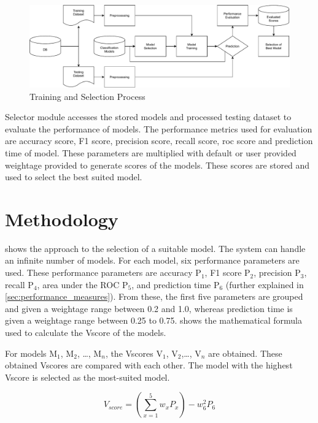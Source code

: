 \begin{figure}[H]
  \centering
  \includegraphics[width=0.9\columnwidth]{media/architecture/Process.pdf}
  \caption{Training and Selection Process}
  \label{fig:training_and_selection_process}
\end{figure}

Selector module accesses the stored models and processed testing dataset to evaluate the performance of models. The performance metrics used for evaluation are accuracy score, F1 score, precision score, recall score, roc score and prediction time of model. These parameters are multiplied with default or user provided weightage provided to generate scores of the models. These scores are stored and used to select the best suited model.

\section{Methodology}\label{sec:methodology}

 shows the approach to the selection of a suitable model. The system can handle an infinite number of models. For each model, six performance parameters are used. These performance parameters are accuracy P$_1$, F1 score P$_2$, precision P$_3$, recall P$_4$, area under the ROC P$_5$, and prediction time P$_6$ (further explained in \cref{sec:performance_measures}). From these, the first five parameters are grouped and given a weightage range between 0.2 and 1.0, whereas prediction time is given a weightage range between 0.25 to 0.75.  shows the mathematical formula used to calculate the Vscore of the models.

For models M$_1$, M$_2$, \ldots, M$_n$, the Vscores V$_1$, V$_2$,\ldots, V$_n$ are obtained. These obtained Vscores are compared with each other. The model with the highest Vscore is selected as the most-suited model.

\begin{equation}\label{eq:v_score}
    V_{score} = \left(\sum_{x=1}^{5} w_xP_x\right) - w_6^2P_6
\end{equation}

